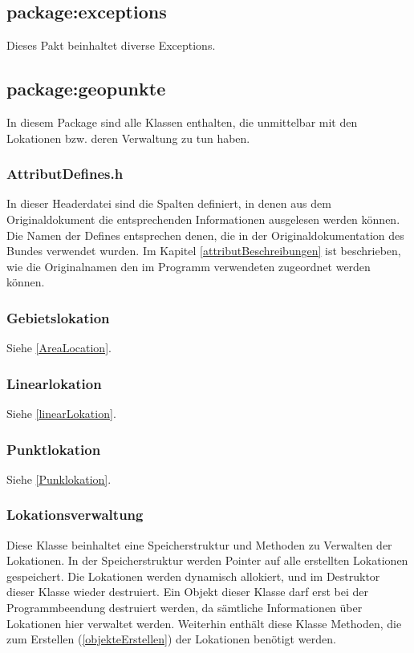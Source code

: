 \documentclass[12pt, a4paper, ngerman]{article}
\begin{document}
\subsection{package:exceptions}
Dieses Pakt beinhaltet diverse Exceptions. 

\subsection{package:geopunkte}
In diesem Package sind alle Klassen enthalten, die unmittelbar mit den Lokationen bzw. deren Verwaltung zu tun haben.
\subsubsection{AttributDefines.h}
In dieser Headerdatei sind die Spalten definiert, in denen aus dem Originaldokument die entsprechenden Informationen ausgelesen werden können. Die Namen der Defines entsprechen denen, die in der Originaldokumentation des Bundes verwendet wurden. Im Kapitel \ref{attributBeschreibungen} ist beschrieben, wie die Originalnamen den im Programm verwendeten zugeordnet werden können. 

\subsubsection{Gebietslokation \label{class:Gebietslokation}}
Siehe \ref{AreaLocation}.

\subsubsection{Linearlokation \label{class:Linearlokation}}
Siehe \ref{linearLokation}.

\subsubsection{Punktlokation \label{class:Punktlokation}}
Siehe \ref{Punklokation}.

\subsubsection{Lokationsverwaltung}
Diese Klasse beinhaltet eine Speicherstruktur und Methoden zu Verwalten der Lokationen. In der Speicherstruktur werden Pointer auf alle erstellten Lokationen gespeichert. Die Lokationen werden dynamisch allokiert, und im Destruktor dieser Klasse wieder destruiert. Ein Objekt dieser Klasse darf erst bei der Programmbeendung destruiert werden, da sämtliche Informationen über Lokationen hier verwaltet werden. Weiterhin enthält diese Klasse Methoden, die zum Erstellen (\ref{objekteErstellen}) der Lokationen benötigt werden.
\end{document}
